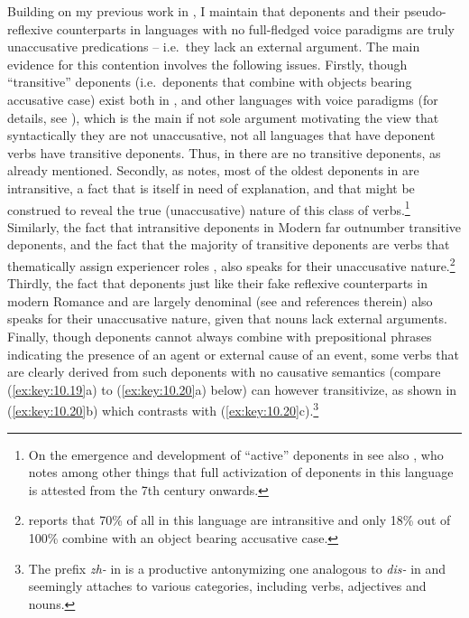 \documentclass[output=paper]{langsci/langscibook}
\begin{document}
Building on my previous work in \citet{Kallulli2013}, I maintain that deponents
and their pseudo-reflexive counterparts in languages with no full-fledged voice
par\-a\-digms are truly unaccusative predications – i.e.\ they lack an external
argument. The main evidence for this contention involves the following issues.
Firstly, though \enquote{transitive} deponents (i.e.\ deponents that combine
with objects bearing accusative case) exist both in ,  and other
languages with voice paradigms (for details, see
\citealt{Grestenberger2014,Grestenberger2018a}), which is the main if not sole argument motivating the view that
syntactically they are not unaccusative, not all languages that have deponent
verbs have transitive deponents. Thus, in  there are no transitive
deponents, as already mentioned. Secondly, as \citet[590]{Flobert1975} notes,
most of the oldest deponents in  are intransitive, a fact that is itself
in need of explanation, and that might be construed to reveal the true
(unaccusative) nature of this class of verbs.\footnote{On the emergence and
    development of \enquote{active} deponents in  see also
    \citet{Cennamo2008}, who notes among other things that full activization of
deponents in this language is attested from the 7th century onwards.}
Similarly, the fact that intransitive deponents in Modern  far outnumber
transitive deponents, and the fact that the majority of transitive deponents
are verbs that thematically assign experiencer roles \citep{Zombolou2012}, also
speaks for their unaccusative nature.\footnote{\citet{Zombolou2012} reports
    that 70\% of all  in this language are intransitive and only
18\% out of 100\% combine with an object bearing accusative case.} Thirdly, the
fact that deponents just like their fake reflexive counterparts in modern
Romance and  are largely denominal (see \citealt{Kallulli2013} and
references therein) also speaks for their unaccusative nature, given that nouns
lack external arguments. Finally, though deponents cannot always combine with
prepositional phrases indicating the presence of an agent or external cause of
an event, some verbs that are clearly derived from such deponents with no
causative semantics (compare (\ref{ex:key:10.19}a) to (\ref{ex:key:10.20}a)
below) can however transitivize, as shown in (\ref{ex:key:10.20}b) which
contrasts with (\ref{ex:key:10.20}c).\footnote{The prefix \emph{zh-} in
     is a productive antonymizing one analogous to \emph{dis-} in
     and seemingly attaches to various categories, including verbs,
adjectives and nouns.}
\end{document}
